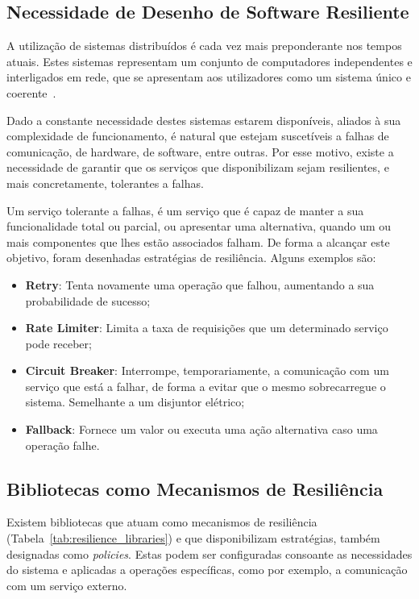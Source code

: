 \subsection{Necessidade de Desenho de Software Resiliente}\label{subsec:necessidade-de-desenho-de-software-resiliente}
A utilização de sistemas distribuídos é cada vez mais preponderante nos tempos atuais.
Estes sistemas representam um conjunto de computadores independentes e interligados em rede, que se apresentam aos utilizadores como um sistema único e coerente~\cite{fcc-distributed-systems}.

Dado a constante necessidade destes sistemas estarem disponíveis, aliados à sua complexidade de funcionamento, é natural que estejam suscetíveis a falhas de comunicação, de hardware, de software, entre outras.
Por esse motivo, existe a necessidade de garantir que os serviços que disponibilizam sejam resilientes, e mais concretamente, tolerantes a falhas.

Um serviço tolerante a falhas, é um serviço que é capaz de manter a sua funcionalidade total ou parcial, ou apresentar uma alternativa, quando um ou mais componentes que lhes estão associados falham.
De forma a alcançar este objetivo, foram desenhadas estratégias de resiliência.
Alguns exemplos são:

\begin{itemize}[topsep=0pt,itemsep=0pt,partopsep=0pt, parsep=0pt]
    \item \textbf{Retry}: Tenta novamente uma operação que falhou, aumentando a sua probabilidade de sucesso;
    \item \textbf{Rate Limiter}: Limita a taxa de requisições que um determinado serviço pode receber;
    \item \textbf{Circuit Breaker}: Interrompe, temporariamente, a comunicação com um serviço que está a falhar, de forma a evitar que o mesmo sobrecarregue o sistema. Semelhante a um disjuntor elétrico;
    \item \textbf{Fallback}: Fornece um valor ou executa uma ação alternativa caso uma operação falhe.
\end{itemize}

\subsection{Bibliotecas como Mecanismos de Resiliência}\label{subsec:bibliotecas-como-mecanismos-de-resiliencia}

Existem bibliotecas que atuam como mecanismos de resiliência (Tabela~\ref{tab:resilience_libraries}) e que disponibilizam estratégias, também designadas como \textit{policies}.
Estas podem ser configuradas consoante as necessidades do sistema e aplicadas a operações específicas, como por exemplo, a comunicação com um serviço externo.

